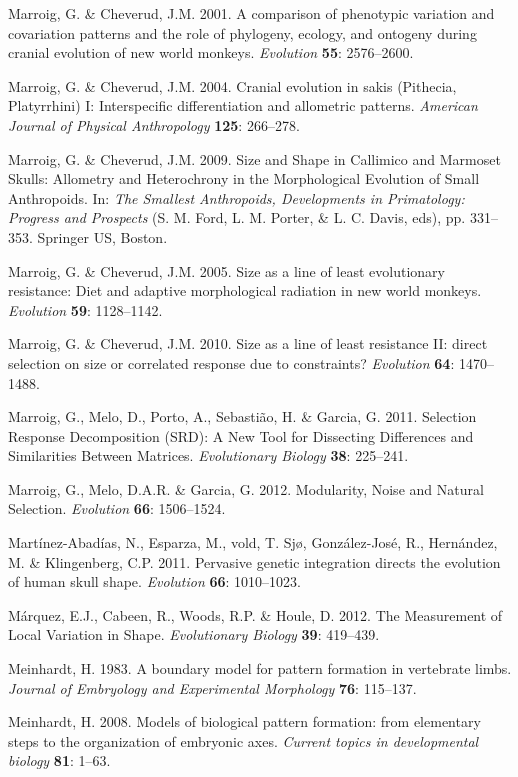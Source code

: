\documentclass[12pt,twoside]{report}
\begin{document}
Marroig, G. \& Cheverud, J.M. 2001. A comparison of phenotypic variation
and covariation patterns and the role of phylogeny, ecology, and
ontogeny during cranial evolution of new world monkeys. \emph{Evolution}
\textbf{55}: 2576--2600.

Marroig, G. \& Cheverud, J.M. 2004. Cranial evolution in sakis
(Pithecia, Platyrrhini) I: Interspecific differentiation and allometric
patterns. \emph{American Journal of Physical Anthropology} \textbf{125}:
266--278.

Marroig, G. \& Cheverud, J.M. 2009. Size and Shape in Callimico and
Marmoset Skulls: Allometry and Heterochrony in the Morphological
Evolution of Small Anthropoids. In: \emph{The Smallest Anthropoids,
Developments in Primatology: Progress and Prospects} (S. M. Ford, L. M.
Porter, \& L. C. Davis, eds), pp. 331--353. Springer US, Boston.

Marroig, G. \& Cheverud, J.M. 2005. Size as a line of least evolutionary
resistance: Diet and adaptive morphological radiation in new world
monkeys. \emph{Evolution} \textbf{59}: 1128--1142.

Marroig, G. \& Cheverud, J.M. 2010. Size as a line of least resistance
II: direct selection on size or correlated response due to constraints?
\emph{Evolution} \textbf{64}: 1470--1488.

Marroig, G., Melo, D., Porto, A., Sebastião, H. \& Garcia, G. 2011.
Selection Response Decomposition (SRD): A New Tool for Dissecting
Differences and Similarities Between Matrices. \emph{Evolutionary
Biology} \textbf{38}: 225--241.

Marroig, G., Melo, D.A.R. \& Garcia, G. 2012. Modularity, Noise and
Natural Selection. \emph{Evolution} \textbf{66}: 1506--1524.

Martínez-Abadías, N., Esparza, M., vold, T. Sjø, González-José, R.,
Hernández, M. \& Klingenberg, C.P. 2011. Pervasive genetic integration
directs the evolution of human skull shape. \emph{Evolution}
\textbf{66}: 1010--1023.

Márquez, E.J., Cabeen, R., Woods, R.P. \& Houle, D. 2012. The
Measurement of Local Variation in Shape. \emph{Evolutionary Biology}
\textbf{39}: 419--439.

Meinhardt, H. 1983. A boundary model for pattern formation in vertebrate
limbs. \emph{Journal of Embryology and Experimental Morphology}
\textbf{76}: 115--137.

Meinhardt, H. 2008. Models of biological pattern formation: from
elementary steps to the organization of embryonic axes. \emph{Current
topics in developmental biology} \textbf{81}: 1--63.
\end{document}
